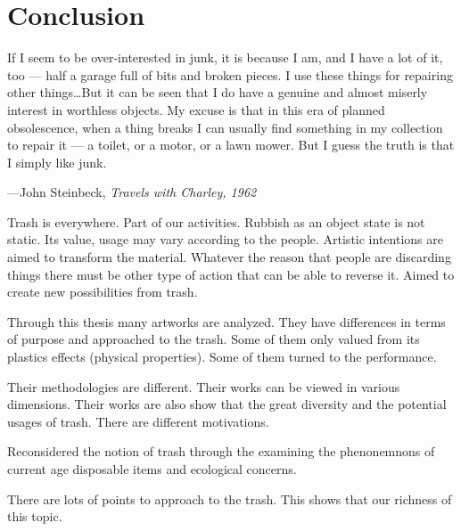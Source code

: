 \chapter{Conclusion}





%
%
\begin{singlespace}
\epigraph{If I seem to be over-interested in junk, it is because I am, and I have a lot of it, too --- half a garage full of bits and broken pieces. I use these things for repairing other things\ldots But it can be seen that I do have a genuine and almost miserly interest in worthless objects. My excuse is that in this era of planned obsolescence, when a thing breaks I can usually find something in my collection to repair it --- a toilet, or a motor, or a lawn mower. But I guess the truth is that I simply like junk.}{\hfill---John Steinbeck, \textit{Travels with Charley, 1962}}
\end{singlespace}




Trash is everywhere. Part of our activities. Rubbish as an object state is not static. Its value, usage may vary according to the people. Artistic intentions are aimed to transform the material. Whatever the reason that people are discarding things there must be other type of action that can be able to reverse it. Aimed to create new possibilities from trash.





%
%
Through this thesis many artworks are analyzed. They have differences in terms of purpose and approached to the trash. Some of them only valued from its plastics effects (physical properties). Some of them turned to the performance. 

Their methodologies are different. Their works can be viewed in various dimensions. Their works are also show that the great diversity and the potential usages of trash. 
There are different motivations. 

Reconsidered the notion of trash through the examining the phenonemnons of current age disposable items and ecological concerns. 

There are lots of points to approach to the trash. This shows that our richness of this topic. 











